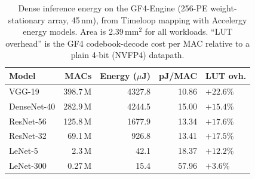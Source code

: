 \begin{table}[t]
  \centering
  \caption{Dense inference energy on the GF4-Engine (256-PE weight-stationary array,
    45\,nm), from Timeloop mapping with Accelergy energy models. Area is
    2.39\,mm$^2$ for all workloads. ``LUT overhead'' is the GF4 codebook-decode cost
    per MAC relative to a plain 4-bit (NVFP4) datapath.}
  \label{tab:gf4-energy}
  \begin{tabular}{lrrr}
    \toprule
    Model & MACs & Energy ($\mu$J) & pJ/MAC & LUT ovh. \\
    \midrule
    VGG-19      & 398.7\,M & 4327.8 & 10.86 & $+22.6\%$ \\
    DenseNet-40 & 282.9\,M & 4244.5 & 15.00 & $+15.4\%$ \\
    ResNet-56   & 125.8\,M & 1677.9 & 13.34 & $+17.6\%$ \\
    ResNet-32   &  69.1\,M &  926.8 & 13.41 & $+17.5\%$ \\
    LeNet-5     &   2.3\,M &   42.1 & 18.37 & $+12.2\%$ \\
    LeNet-300   &   0.27\,M &  15.4 & 57.96 &  $+3.6\%$ \\
    \bottomrule
  \end{tabular}
\end{table}

